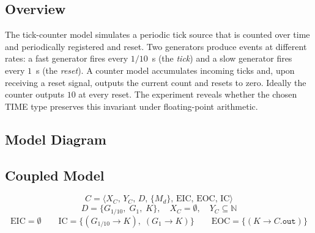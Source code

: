 \subsection*{Overview}

The tick-counter model simulates a periodic tick source that is counted
over time and periodically registered and reset.  Two generators
produce events at different rates: a fast generator fires every
$1/10$~s (the \emph{tick}) and a slow generator fires every $1$~s (the
\emph{reset}).  A counter model accumulates incoming ticks and, upon
receiving a reset signal, outputs the current count and resets to zero.
Ideally the counter outputs $10$ at every reset.  The experiment
reveals whether the chosen TIME type preserves this invariant under
floating-point arithmetic.

\subsection*{Model Diagram}

\begin{center}
\end{center}

\subsection*{Coupled Model}

\[
  C = \langle X_C,\, Y_C,\, D,\, \{M_d\},\, \text{EIC},\, \text{EOC},\, \text{IC} \rangle
\]
\[
  D = \{G_{1/10},\; G_{1},\; K\},\quad X_C = \emptyset,\quad Y_C \subseteq \mathbb{N}
\]
\[
  \text{EIC} = \emptyset
  \qquad
  \text{IC} = \{(G_{1/10} \to K),\; (G_{1} \to K)\}
  \qquad
  \text{EOC} = \{(K \to C.\texttt{out})\}
\]

